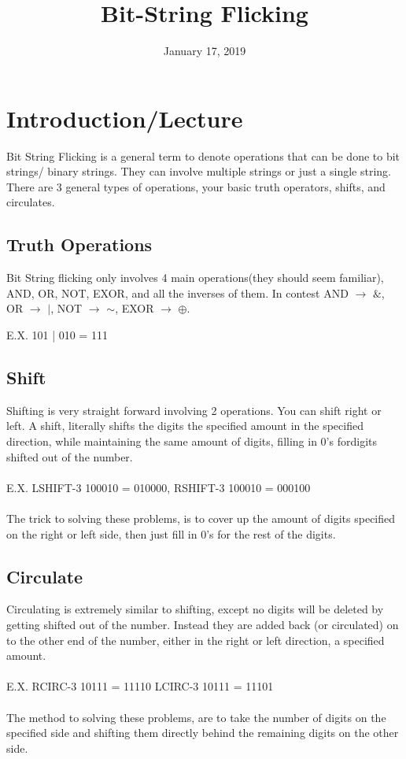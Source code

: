 \documentclass{pset_template}
\title{Bit-String Flicking}
\date{January 17, 2019}
\begin{document}
\maketitle

\section{Introduction/Lecture}
Bit String Flicking is a general term to denote operations that can be done to bit strings/ binary strings. They can involve multiple strings or just a single string. There are 3 general types of operations, your basic truth operators, shifts, and circulates.
\subsection{Truth Operations}
Bit String flicking only involves 4 main operations(they should seem familiar), AND, OR, NOT, EXOR, and all the inverses of them. In contest AND $\rightarrow$ $\&$, OR $\rightarrow$ $\mid$, NOT $\rightarrow$ $\sim$,  EXOR $\rightarrow$ $\oplus$.

E.X. 101 | 010 = 111
\subsection{Shift}
Shifting is very straight forward involving 2 operations. You can shift right or left. A shift, literally shifts the digits the specified amount in the specified direction, while maintaining the same amount of digits, filling in 0's fordigits shifted out of the number.
\\
\\
E.X. LSHIFT-3 100010 =  010000, RSHIFT-3 100010 = 000100
\\
\\
The trick to solving these problems, is to cover up the amount of digits specified on the right or left side, then just fill in 0's for the rest of the digits.
\subsection{Circulate}
Circulating is extremely similar to shifting, except no digits will be deleted by getting shifted out of the number. Instead they are added back (or circulated) on to the other end of the number, either in the right or left direction, a specified amount.
\\
\\
E.X. RCIRC-3    10111 = 11110         LCIRC-3   10111 = 11101
\\
\\
The method to solving these problems, are to take the number of digits on the specified side and shifting them directly behind the remaining digits on the other side.
\end{document}
